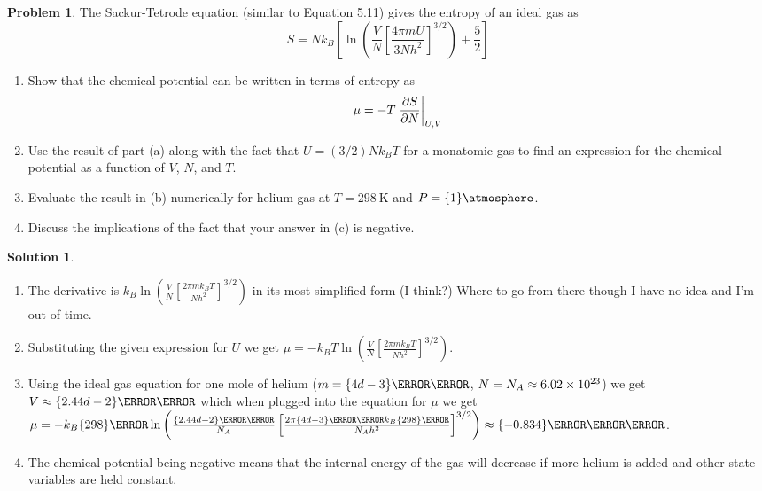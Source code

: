 \documentclass[10pt]{article}
\theoremstyle{definition}
\newtheorem{problem}{Problem}
\newtheorem{soln}{Solution}
\begin{document}
\begin{problem}
The Sackur-Tetrode equation (similar to Equation 5.11) gives the entropy of an ideal gas as
$$S=Nk_B\left[\ln\left(\frac{V}{N}\left[\frac{4\pi mU}{3Nh^2}\right]^{3/2}\right)+\frac{5}{2}\right]$$
\begin{enumerate}[label=(\alph*)]
  \item Show that the chemical potential can be written in terms of entropy as
        $$\mu=-T\eval{\frac{\partial S}{\partial N}}_{U,V}$$
  \item Use the result of part (a) along with the fact that $U = (3/2)Nk_BT$ for
        a monatomic gas to find an expression for the chemical potential as
        a function of $V$, $N$, and $T$.
  \item Evaluate the result in (b) numerically for helium gas at $T = \qty{298}{\kelvin}$ and $P = \qty{1}{\atmosphere}$.
  \item Discuss the implications of the fact that your answer in (c) is negative.
\end{enumerate}
\end{problem}
\begin{soln}~
  \begin{enumerate}[label=(\alph*)]
    \item The derivative is $k_B\ln\left(\frac{V}{N}\left[\frac{2\pi mk_BT}{Nh^2}\right]^{3/2}\right)$ in its most simplified form (I think?)
          Where to go from there though I have no idea and I'm out of time.
    \item Substituting the given expression for $U$ we get $\mu=-k_BT\ln\left(\frac{V}{N}\left[\frac{2\pi mk_BT}{Nh^2}\right]^{3/2}\right)$.
    \item Using the ideal gas equation for one mole of helium ($m=\qty{4d-3}{\kilo\gram}$, $N=N_A\approx\num{6.02d23}$) we get $V\approx\qty{2.44d-2}{\meter\cubed}$
          which when plugged into the equation for $\mu$ we get
          $\mu=-k_B\qty{298}{\kelvin}\ln\left(\frac{\qty{2.44d-2}{\meter\cubed}}{N_A}\left[\frac{2\pi \qty{4d-3}{\kilo\gram}k_B\qty{298}{\kelvin}}{N_Ah^2}\right]^{3/2}\right)\approx
            \qty{-0.834}{\electronvolt\per\kilogram}$.
    \item The chemical potential being negative means that the internal energy of the gas will decrease if more helium is added and other state variables are held constant.
  \end{enumerate}
\end{soln}
\end{document}
